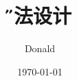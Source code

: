%  
%  
%  
%  
%  


\documentclass[12pt]{article}
\usepackage{geometry}
\geometry{letterpaper}

\usepackage{fontspec,xltxtra,xunicode}
\XeTeXlinebreaklocale “zh”
\XeTeXlinebreakskip = 0pt plus 1pt minus 0.1pt %

\title{\H 算法设计}
\author{Donald}
\date{\E\today}


\maketitle
这个段落中，夹杂着一个{\E word}。
